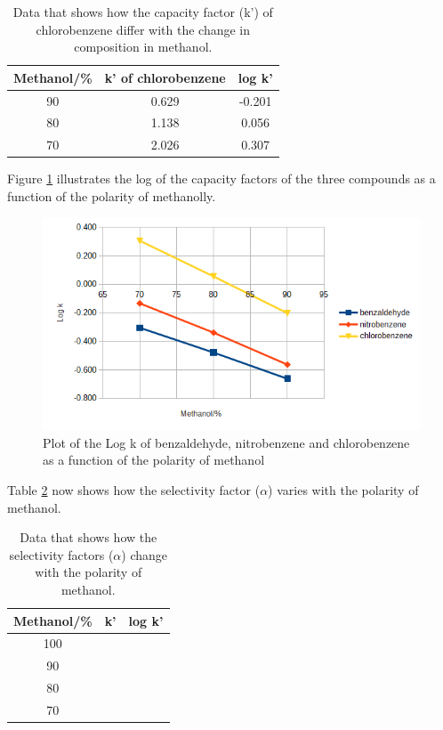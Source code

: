 \documentclass[a4paper, 12pt]{article}
\begin{document}
\begin{table}[h!]
	\centering
	\caption{Data that shows how the capacity factor (k') of chlorobenzene differ with the change in composition in methanol.}
	\begin{tabular}{|c|c|c|}
		\hline
		Methanol/\% & k' of chlorobenzene & log k' \\
		\hline
		90 & 0.629 & -0.201 \\
		\hline
		80 & 1.138 & 0.056 \\
		\hline
		70 & 2.026 & 0.307 \\
		\hline
	\end{tabular}
	\label{tab-cf-chlorobenzene}
\end{table}

Figure \ref{fig-capacity-factors} illustrates the log of the capacity factors of the three compounds as a function of the polarity of methanolly.

\begin{figure}[h!]
	\centering
	\includegraphics[width=1\textwidth]{fig-capacity-2}
	\caption{Plot of the Log k of benzaldehyde, nitrobenzene and chlorobenzene as a function of the polarity of methanol}
	\label{fig-capacity-factors}
\end{figure}

Table \ref{tab-selectivity} now shows how the selectivity factor ($\alpha$) varies with the polarity of methanol.

\begin{table}[h!]
	\centering
	\caption{Data that shows how the selectivity factors ($\alpha$) change with the polarity of methanol.}
	\begin{tabular}{|c|c|c|}
		\hline
		Methanol/\% & k' & log k' \\
		\hline
		100 & & \\
		\hline
		90 & & \\
		\hline
		80 & & \\
		\hline
		70 & & \\
		\hline
	\end{tabular}
	\label{tab-selectivity}
\end{table}
\end{document}
